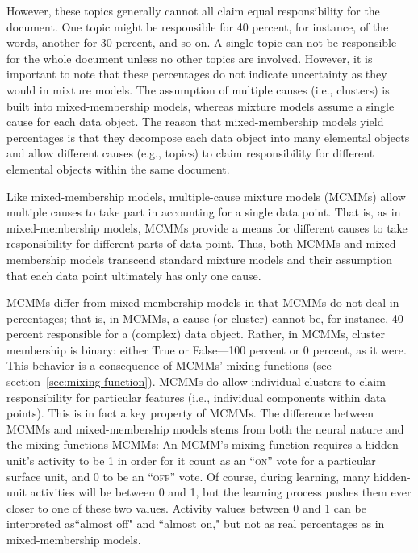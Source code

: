 However, these topics generally cannot all claim equal responsibility
for the document. One topic might be responsible for 40 percent, for instance,
of the words, another for 30 percent, and so on. A single topic can not be responsible for the whole 
document unless no other topics are involved.  However, it is important to note that these 
percentages do not indicate uncertainty as they would in mixture models. The assumption
of multiple causes (i.e., clusters) is built 
into mixed-membership models, whereas mixture models assume a single cause for each 
data object. The reason that mixed-membership models yield percentages is 
that they decompose each data object into many elemental objects and allow different 
causes (e.g., topics) to claim responsibility for different elemental objects within the same document. 

Like mixed-membership models, multiple-cause mixture models (MCMMs) 
allow multiple causes to take part in accounting for a single data point. 
That is, as in mixed-membership models, MCMMs provide a means for 
different causes to take responsibility for different parts of data point. 
Thus, both MCMMs and mixed-membership models transcend standard 
mixture models and their assumption that each data point ultimately has 
only one cause. %

MCMMs differ from mixed-membership models in that MCMMs do not deal in 
percentages; that is, in MCMMs, a cause (or cluster) cannot be, for instance, 
40 percent responsible for a (complex) data object. Rather, in MCMMs, 
cluster membership is binary: either True or False---100 percent or 0 percent, as it were. 
This behavior is a consequence of MCMMs' mixing functions (see section~\ref{sec:mixing-function}). 
MCMMs do allow individual clusters to claim responsibility 
for particular features (i.e., individual components within data points). This is in fact a key property of MCMMs. 
The difference between MCMMs and mixed-membership models stems from 
both the neural nature and the mixing functions MCMMs: An MCMM's mixing 
function requires a hidden unit's activity to be 1 in order for it count as an 
``\textsc{on}'' vote for a particular surface unit, and 0 to be an ``\textsc{off}'' vote. 
Of course, during learning, many hidden-unit activities will be between 0 and 1, 
but the learning process pushes them ever closer to one of these two values. 
Activity values between 0 and 1 can be interpreted as``almost off" and ``almost on," 
but not as real percentages as in mixed-membership models. 

